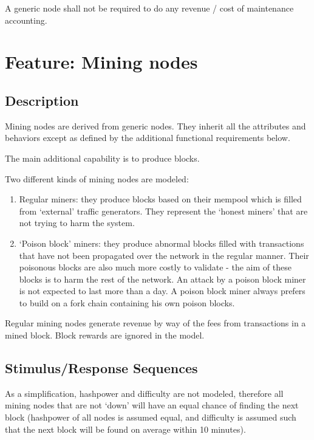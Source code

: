 \documentclass{scrreprt}
\begin{document}
A generic node shall not be required to do any revenue / cost of maintenance accounting.



\section{Feature: Mining nodes}

\subsection{Description}

Mining nodes are derived from generic nodes. They inherit all the
attributes and behaviors except as defined by the additional functional
requirements below.

The main additional capability is to produce blocks.

Two different kinds of mining nodes are modeled:

\begin{enumerate}
   \item Regular miners: they produce blocks based on their mempool which is filled from `external' traffic generators. They represent the `honest miners' that are not trying to harm the system.
   \item `Poison block' miners: they produce abnormal blocks filled with transactions that have not been propagated over the network in the regular manner. Their poisonous blocks are also much more costly to validate - the aim of these blocks is to harm the rest of the network. An attack by a poison block miner is not expected to last more than a day. A poison block miner always prefers to build on a fork chain containing his own poison blocks.
\end{enumerate}

Regular mining nodes generate revenue by way of the fees from transactions
in a mined block. Block rewards are ignored in the model.


\subsection{Stimulus/Response Sequences}

As a simplification, hashpower and difficulty are not modeled, therefore
all mining nodes that are not `down' will have an equal chance of finding
the next block (hashpower of all nodes is assumed equal, and difficulty
is assumed such that the next block will be found on average within 10
minutes).
\end{document}
